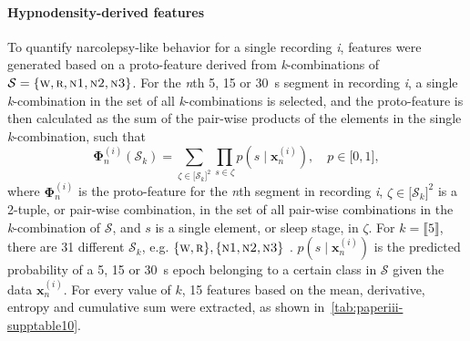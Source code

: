 \paragraph{Hypnodensity-derived features}
To quantify narcolepsy-like behavior for a single recording \textit{i}, features were generated based on a proto-feature derived from \textit{k}-combinations of $\mathcal{S} = \lbrace \textsc{w}, \textsc{r}, \textsc{n1}, \textsc{n2}, \textsc{n3} \rbrace$. 
For the \textit{n}th \num{5}, \num{15} or \SI{30}{\second} segment in recording \textit{i}, a single \textit{k}-combination in the set of all \textit{k}-combinations is selected, and the proto-feature is then calculated as the sum of the pair-wise products of the elements in the single \textit{k}-combination, such that
\begin{equation}
    \boldsymbol{\Phi}^{(i)}_{n} \! \! \left( \mathcal{S}_{k} \right) = \sum_{\zeta \in \lbrack \mathcal{S}_{k} \rbrack^2} \prod_{s \in \zeta}{p\!\left( \! s \! \mid \! \mathbf{x}_{n}^{(i)} \! \right)}, \quad p \in \lbrack 0,1 \rbrack,
\end{equation}
where $\boldsymbol{\Phi}^{(i)}_{n}$ is the proto-feature for the \textit{n}th segment in recording \textit{i}, $\zeta \in \lbrack \mathcal{S}_{k} \rbrack^2$ is a \num{2}-tuple, or pair-wise combination, in the set of all pair-wise combinations in the \textit{k}-combination of $\mathcal{S}$, and $s$ is a single element, or sleep stage, in $\zeta$.
For $k=\llbracket 5 \rrbracket$, there are \num{31} different $\mathcal{S}_k$, e.g. $\lbrace \textsc{w}, \textsc{r} \rbrace, \lbrace \textsc{n1}, \textsc{n2}, \textsc{n3} \rbrace$ \etc.
$p\!\left( \! s \! \mid \! \mathbf{x}_{n}^{(i)} \! \right)$ is the predicted probability of a \num{5}, \num{15} or \SI{30}{\second} epoch belonging to a certain class in $\mathcal{S}$ given the data $\mathbf{x}^{(i)}_n$.
For every value of $k$, \num{15} features based on the mean, derivative, entropy and cumulative sum were extracted, as shown in~\cref{tab:paperiii-supptable10}.

